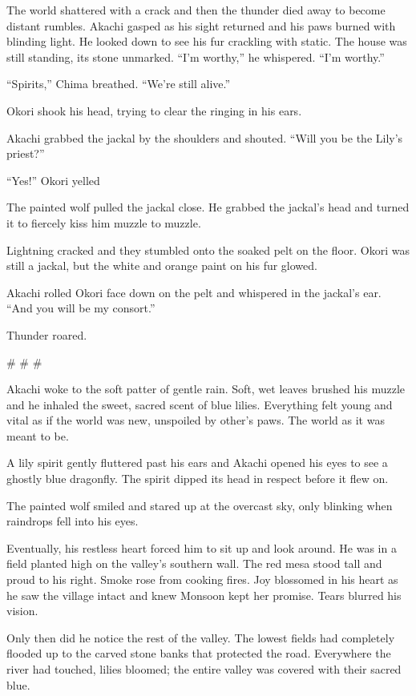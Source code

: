 The world shattered with a crack and then the thunder died away to become distant rumbles. Akachi gasped as his sight returned and his paws burned with blinding light. He looked down to see his fur crackling with static. The house was still standing, its stone unmarked. ``I'm worthy,'' he whispered. ``I'm worthy.''

``Spirits,'' Chima breathed. ``We're still alive.''

Okori shook his head, trying to clear the ringing in his ears.

Akachi grabbed the jackal by the shoulders and shouted. ``Will you be the Lily's priest?''

``Yes!'' Okori yelled

The painted wolf pulled the jackal close. He grabbed the jackal's head and turned it to fiercely kiss him muzzle to muzzle.

Lightning cracked and they stumbled onto the soaked pelt on the floor. Okori was still a jackal, but the white and orange paint on his fur glowed.

Akachi rolled Okori face down on the pelt and whispered in the jackal's ear. ``And you will be my consort.''

Thunder roared.

\# \# \#

Akachi woke to the soft patter of gentle rain. Soft, wet leaves brushed his muzzle and he inhaled the sweet, sacred scent of blue lilies. Everything felt young and vital as if the world was new, unspoiled by other's paws. The world as it was meant to be.

A lily spirit gently fluttered past his ears and Akachi opened his eyes to see a ghostly blue dragonfly. The spirit dipped its head in respect before it flew on.

The painted wolf smiled and stared up at the overcast sky, only blinking when raindrops fell into his eyes.

Eventually, his restless heart forced him to sit up and look around. He was in a field planted high on the valley's southern wall. The red mesa stood tall and proud to his right. Smoke rose from cooking fires. Joy blossomed in his heart as he saw the village intact and knew Monsoon kept her promise. Tears blurred his vision.

Only then did he notice the rest of the valley. The lowest fields had completely flooded up to the carved stone banks that protected the road. Everywhere the river had touched, lilies bloomed; the entire valley was covered with their sacred blue.

